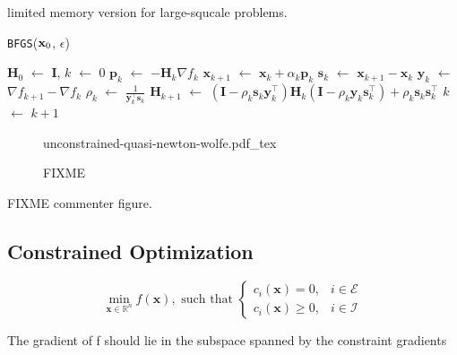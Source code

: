 limited memory version for large-squcale problems.

\begin{algorithm}
\caption{\texttt{BFGS}($\mathbf{x}_0$, $\epsilon$)}
\label{alg:chap3-bfgs}
\begin{algorithmic}
\STATE $\mathbf{H}_0$ $\leftarrow$ $\mathbf{I}$, $k$ $\leftarrow$ $0$
\STATE $\mathbf{p}_k$ $\leftarrow$ $-\mathbf{H}_k\nabla f_k$
\STATE $\mathbf{x}_{k+1}$ $\leftarrow$ $\mathbf{x}_k + \alpha_k\mathbf{p}_k$
\STATE $\mathbf{s}_k$ $\leftarrow$ $\mathbf{x}_{k+1} - \mathbf{x}_k$
\STATE $\mathbf{y}_k$ $\leftarrow$ $\nabla f_{k+1} - \nabla f_k$
\STATE $\rho_k$ $\leftarrow$ $\frac{1}{\mathbf{y}_k^{\top}\mathbf{s}_k}$
\STATE $\mathbf{H}_{k+1}$ $\leftarrow$ $(\mathbf{I}-\rho_k\mathbf{s}_k\mathbf{y}_k^{\top})\mathbf{H}_k(\mathbf{I}-\rho_k\mathbf{y}_k\mathbf{s}_k^{\top})+\rho_k\mathbf{s}_k\mathbf{s}_k^{\top}$
\STATE $k$ $\leftarrow$ $k + 1$
\ENDWHILE
\end{algorithmic}
\end{algorithm}

\begin{figure}
  \centering
      {\def\svgwidth{0.5\linewidth}
        {\footnotesize
          
                     {unconstrained-quasi-newton-wolfe.pdf_tex}
        }
      }
      \caption{FIXME}
      \label{fig:chap3-unconstrained-quasi-newton-wolfe}
\end{figure}

FIXME commenter figure.

\subsection{Constrained Optimization}

\begin{equation}
\label{eq:chap3-nlp}
\min_{\mathbf{x} \in \mathbb R^n}
f(\mathbf{x}),\text{ such that }
\left\{\begin{array}{cc}
c_i(\mathbf{x}) = 0, & i \in \mathcal{E} \\%
c_i(\mathbf{x}) \ge 0, & i \in \mathcal{I} %
\end{array}\right.
\end{equation}

The gradient of f should lie in the subspace spanned by the constraint
gradients

